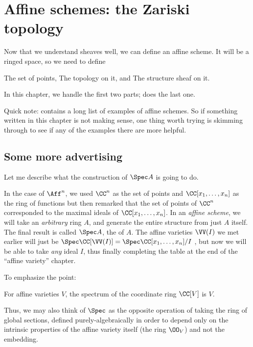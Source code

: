 \chapter{Affine schemes: the Zariski topology}
\label{ch:spec_zariski}
Now that we understand sheaves well,
we can define an affine scheme.
It will be a ringed space, so we need to define
\begin{itemize}
	\ii The set of points,
	\ii The topology on it, and
	\ii The structure sheaf on it.
\end{itemize}
In this chapter, we handle the first two parts;
 does the last one.

Quick note: 
contains a long list of examples of affine schemes.
So if something written in this chapter is not making sense,
one thing worth trying is skimming through 
to see if any of the examples there are more helpful.

\section{Some more advertising}
Let me describe what the construction of $\Spec A$ is going to do.

In the case of $\Aff^n$, we used $\CC^n$ as the set of points
and $\CC[x_1, \dots, x_n]$ as the ring of functions
but then remarked that the set of points
of $\CC^n$ corresponded to the maximal ideals of $\CC[x_1, \dots, x_n]$.
In an \emph{affine scheme}, we will take an \emph{arbitrary} ring $A$,
and generate the entire structure from just $A$ itself.
The final result is called $\Spec A$, the  of $A$.
The affine varieties $\VV(I)$ we met earlier will just be
$\Spec \CC[\VV(I)] = \Spec \CC[x_1, \dots, x_n] / I$
, but now we will be able to take
\emph{any} ideal $I$, thus finally completing the table at the end
of the ``affine variety'' chapter.

To emphasize the point:
\begin{moral}
	For affine varieties $V$, the spectrum of the coordinate ring $\CC[V]$ is
	$V$.
\end{moral}
Thus, we may also think of $\Spec$ as the opposite operation of taking the
ring of global sections, defined purely-algebraically in order to depend only on
the intrinsic properties of the affine variety itself (the ring $\OO_V$) and not
the embedding.

